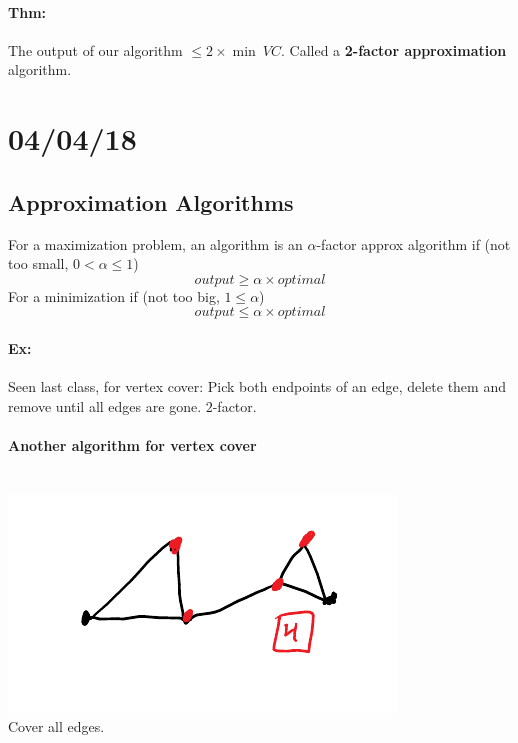 \documentclass[12 pt]{article}
\begin{document}
          \paragraph{Thm:} The output of our algorithm $\leq 2 \times
          \min \ VC$. Called a \textbf{2-factor approximation} algorithm.
          \section{04/04/18}
          \subsection{Approximation Algorithms}
          For a maximization problem, an algorithm is an
          $\alpha$-factor approx algorithm if (not too small, $0 <
          \alpha \leq 1$)
          $$output \geq \alpha \times optimal$$
          For a minimization if (not too big, $1 \leq \alpha$)
          $$output \leq \alpha \times optimal$$
          \paragraph{Ex:}
          Seen last class, for vertex cover: Pick both endpoints of an
          edge, delete them and remove until all edges are
          gone. $2$-factor.
          \paragraph{Another algorithm for vertex cover}
          ~
          \\ \includegraphics[width=.9\textwidth]{i150.pdf}
          \\ Cover all edges.
\end{document}
